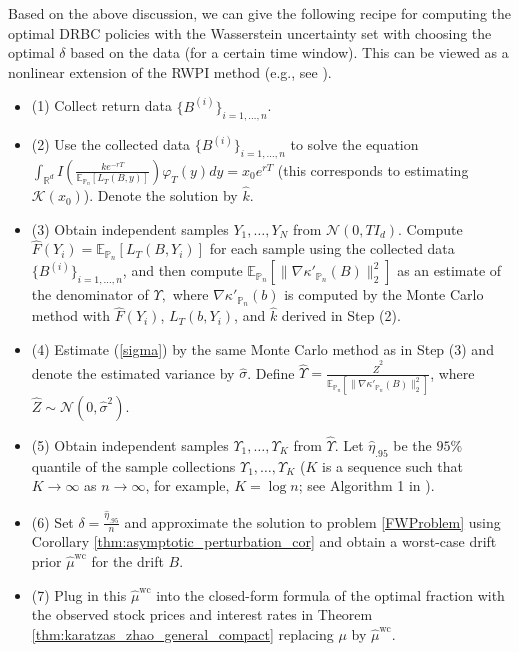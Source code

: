 \documentclass[11pt]{article}
\theoremstyle{definition}
\newcommand{\E}{\mathbb{E}}
\begin{document}
Based on the above discussion, we can give the following recipe for computing the optimal DRBC policies with the Wasserstein uncertainty set with choosing the optimal $\delta$ based on the data (for a certain time window). This can be viewed as a nonlinear extension of the RWPI method (e.g., see \cite{BlanchetChenZhou2021, Blanchet2021WassersteinDRO}).
\begin{itemize}
\label{bullpoint}
    \item (1) Collect return data $\{B^{(i)}\}_{i = 1, \ldots, n}$.
    \item (2) Use the collected data $\{B^{(i)}\}_{i = 1, \ldots, n}$ to solve the equation $\int_{\mathbb{R}^d }I\left(\frac{ke^{-rT}}{\mathbb{E}_{\mathbb{P}_n}\left[L_T(B,y)\right]}\right)\varphi_T(y)dy = x_0e^{rT}$ (this corresponds to estimating $\mathcal{K}(x_0)$). Denote the solution by $\hat{k}$.
    \item (3) Obtain independent samples $Y_1, \ldots, Y_N$ from $\mathcal{N}(0,TI_d)$. Compute $\hat{F}(Y_i)  = \E_{\mathbb{P}_n}[L_T(B, Y_i)]$ for each sample using the collected data $\{B^{(i)}\}_{i = 1, \ldots, n}$, and then compute {$\E_{\mathbb{P}_n}[\|\nabla \kappa'_{\mathbb{P}_n}(B)\|_2^2]$} as an estimate of the denominator of $\Upsilon,$ where {$\nabla \kappa'_{\mathbb{P}_n}(b)$} is computed by the Monte Carlo method with $\hat{F}(Y_i)$, $L_T(b, Y_i)$, and $\hat{k}$ derived in Step (2).

    \item (4) Estimate (\ref{sigma}) by the same Monte Carlo method as in Step (3) and denote the estimated variance by $\hat{\sigma}$. Define 
    {$\hat{\Upsilon} = \frac{\hat{Z}^2}{\E_{\mathbb{P}_n}[\|\nabla \kappa'_{\mathbb{P}_n}(B)\|_2^2]}$}, where $\hat{Z} \sim \mathcal{N}(0, \hat{\sigma}^2)$. 
    
    
    \item (5) Obtain independent samples $\Upsilon_1, \dots, \Upsilon_K$ from $\hat{\Upsilon}$. Let $\hat{\eta}_{.95}$ be the $95\%$ quantile of the sample collections $\Upsilon_1, \dots, \Upsilon_K$ ($K$ is a sequence such that $K \to \infty$ as $n \to \infty$, for example, $K = \log n$; see Algorithm 1 in \cite{Blanchet2021WassersteinDRO}). 
    \item (6) Set $\delta = \frac{\hat{\eta}_{.95}}{n}$ and approximate the solution to problem \eqref{FWProblem} using Corollary \ref{thm:asymptotic_perturbation_cor} and obtain a worst-case drift prior {\(\widehat\mu^{\text{wc}}\)} for the drift $B$.
    \item (7) Plug in this {\(\widehat\mu^{\text{wc}}\)} into the closed-form formula of the optimal fraction with the observed stock prices and interest rates in Theorem \ref{thm:karatzas_zhao_general_compact} replacing $\mu$ by {\(\widehat\mu^{\text{wc}}\)}.
\end{itemize}
\end{document}
